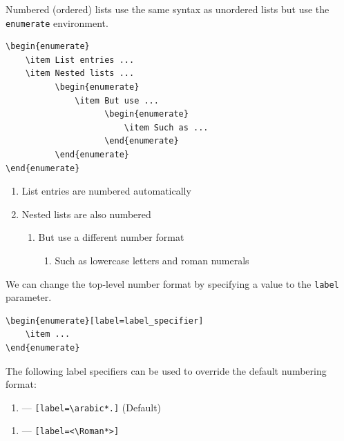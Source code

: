 \documentclass[11pt, twoside]{article}
\begin{document}
Numbered (ordered) lists use the same syntax as unordered lists but use the \lstinline{enumerate} environment.
\begin{lstlisting}
\begin{enumerate}
    \item List entries ...
    \item Nested lists ...
          \begin{enumerate}
              \item But use ...
                    \begin{enumerate}
                        \item Such as ...
                    \end{enumerate}
          \end{enumerate}
\end{enumerate}
\end{lstlisting}
\begin{outputbox}
    \begin{enumerate}
        \item List entries are numbered automatically
        \item Nested lists are also numbered
              \begin{enumerate}
                  \item But use a different number format
                        \begin{enumerate}
                            \item Such as lowercase letters and roman numerals
                        \end{enumerate}
              \end{enumerate}
    \end{enumerate}
\end{outputbox}
We can change the top-level number format by specifying a value to the \lstinline{label}
parameter.
\begin{lstlisting}
\begin{enumerate}[label=label_specifier]
    \item ...
\end{enumerate}
\end{lstlisting}
The following label specifiers can be used to override the default numbering format:
\begin{enumerate}[label=\arabic*.]
    \item --- \lstinline|[label=\arabic*.]| (Default)
\end{enumerate}
\begin{enumerate}[label=<\Roman*>]
    \item --- \lstinline|[label=<\Roman*>]|
\end{enumerate}
\end{document}
